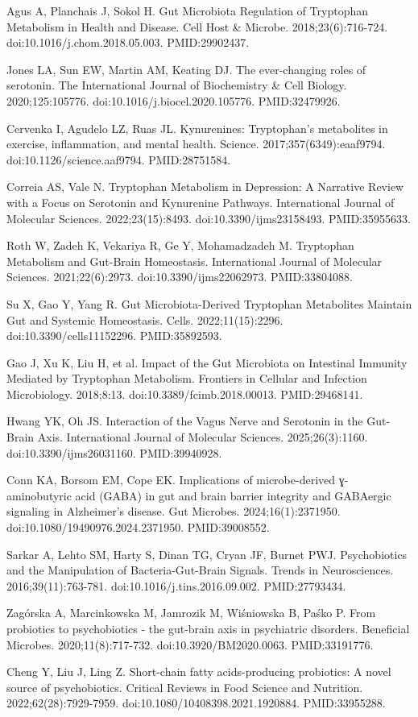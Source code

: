 \documentclass[11pt,oneside]{book}
\newcommand{\reff}[2]{\par\hangindent=7mm\hangafter=1\noindent[#1]\hspace{2mm}#2\par}
\begin{document}
\reff{24}{Agus A, Planchais J, Sokol H. Gut Microbiota Regulation of Tryptophan Metabolism in Health and Disease. Cell Host \& Microbe. 2018;23(6):716-724. doi:10.1016/j.chom.2018.05.003. PMID:29902437.}
\reff{25}{Jones LA, Sun EW, Martin AM, Keating DJ. The ever-changing roles of serotonin. The International Journal of Biochemistry \& Cell Biology. 2020;125:105776. doi:10.1016/j.biocel.2020.105776. PMID:32479926.}
\reff{26}{Cervenka I, Agudelo LZ, Ruas JL. Kynurenines: Tryptophan's metabolites in exercise, inflammation, and mental health. Science. 2017;357(6349):eaaf9794. doi:10.1126/science.aaf9794. PMID:28751584.}
\reff{27}{Correia AS, Vale N. Tryptophan Metabolism in Depression: A Narrative Review with a Focus on Serotonin and Kynurenine Pathways. International Journal of Molecular Sciences. 2022;23(15):8493. doi:10.3390/ijms23158493. PMID:35955633.}
\reff{28}{Roth W, Zadeh K, Vekariya R, Ge Y, Mohamadzadeh M. Tryptophan Metabolism and Gut-Brain Homeostasis. International Journal of Molecular Sciences. 2021;22(6):2973. doi:10.3390/ijms22062973. PMID:33804088.}
\reff{29}{Su X, Gao Y, Yang R. Gut Microbiota-Derived Tryptophan Metabolites Maintain Gut and Systemic Homeostasis. Cells. 2022;11(15):2296. doi:10.3390/cells11152296. PMID:35892593.}
\reff{30}{Gao J, Xu K, Liu H, et al. Impact of the Gut Microbiota on Intestinal Immunity Mediated by Tryptophan Metabolism. Frontiers in Cellular and Infection Microbiology. 2018;8:13. doi:10.3389/fcimb.2018.00013. PMID:29468141.}
\reff{31}{Hwang YK, Oh JS. Interaction of the Vagus Nerve and Serotonin in the Gut-Brain Axis. International Journal of Molecular Sciences. 2025;26(3):1160. doi:10.3390/ijms26031160. PMID:39940928.}
\reff{32}{Conn KA, Borsom EM, Cope EK. Implications of microbe-derived ɣ-aminobutyric acid (GABA) in gut and brain barrier integrity and GABAergic signaling in Alzheimer's disease. Gut Microbes. 2024;16(1):2371950. doi:10.1080/19490976.2024.2371950. PMID:39008552.}
\reff{33}{Sarkar A, Lehto SM, Harty S, Dinan TG, Cryan JF, Burnet PWJ. Psychobiotics and the Manipulation of Bacteria-Gut-Brain Signals. Trends in Neurosciences. 2016;39(11):763-781. doi:10.1016/j.tins.2016.09.002. PMID:27793434.}
\reff{34}{Zagórska A, Marcinkowska M, Jamrozik M, Wiśniowska B, Paśko P. From probiotics to psychobiotics - the gut-brain axis in psychiatric disorders. Beneficial Microbes. 2020;11(8):717-732. doi:10.3920/BM2020.0063. PMID:33191776.}
\reff{35}{Cheng Y, Liu J, Ling Z. Short-chain fatty acids-producing probiotics: A novel source of psychobiotics. Critical Reviews in Food Science and Nutrition. 2022;62(28):7929-7959. doi:10.1080/10408398.2021.1920884. PMID:33955288.}
\end{document}
